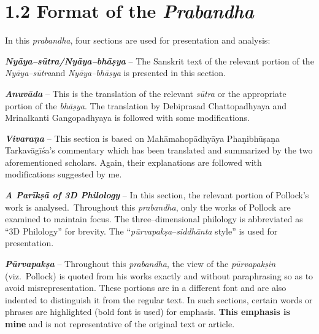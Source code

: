 \vspace{-.3cm}

\section*{1.2 Format of the {\it {\bfseries Prabandha}}}

\vspace{-.2cm}

In this \textit{prabandha}, four sections are used for presentation and analysis:

\textit{\textbf{Nyāya–sūtra/Nyāya–bhāṣya}} – The Sanskrit text of the relevant portion of the \textit{Nyāya–sūtra}and \textit{Nyāya–bhāṣya} is presented in this section.

\textit{\textbf{Anuvāda}} – This is the translation of the relevant \textit{sūtra} or the appropriate portion of the \textit{bhāṣya}. The translation by Debiprasad Chattopadhyaya and Mrinalkanti Gangopadhyaya is followed with some modifications.

\textit{\textbf{Vivaraṇa}} – This section is based on Mahāmahopādhyāya Phaṇibhūṣaṇa Tarkavāgīśa’s commentary which has been translated and summarized by the two aforementioned scholars. Again, their explanations are followed with modifications suggested by me.

\textbf{\textit{A Parīkṣā of 3D Philology}} – In this section, the relevant portion of Pollock’s work is analysed.~Throughout this \textit{prabandha}, only the works of Pollock are examined to maintain focus. The three–dimensional philology is abbreviated as “3D Philology” for brevity. The “\textit{pūrvapakṣa}–\textit{siddhānta} style” is used for presentation.

\textit{\textbf{Pūrvapakṣa}} – Throughout this \textit{prabandha}, the view of the \textit{pūrvapakṣin} (viz.~Pollock) is quoted from his works exactly and without paraphrasing so as to avoid misrepresentation. These portions are in a different font and are also indented to distinguish it from the regular text. In such sections, certain words or phrases are highlighted (bold font is used) for emphasis. \textbf{This emphasis is mine} and is not representative of the original text or article.

